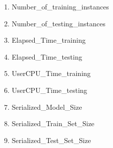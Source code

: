 \documentclass[a4paper,12pt, english]{article}
\begin{document}
\begin{enumerate}
\begin{enumerate}
\end{enumerate}

                
\item Number\_of\_training\_instances

\item Number\_of\_testing\_instances          

\item Elapsed\_Time\_training

\item Elapsed\_Time\_testing

\item UserCPU\_Time\_training

\item UserCPU\_Time\_testing
    
\item Serialized\_Model\_Size

\item Serialized\_Train\_Set\_Size

\item Serialized\_Test\_Set\_Size
	    
\end{enumerate}



    

    
\end{document}
